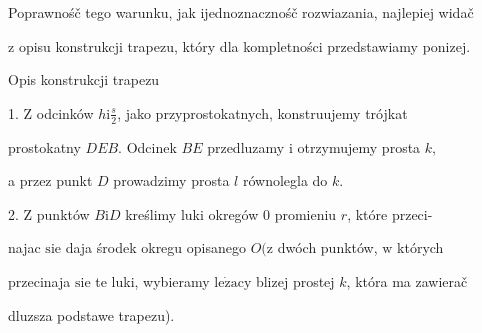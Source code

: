 \documentclass[a4paper,12pt]{article}
\begin{document}
Poprawnośč tego warunku, jak ijednoznacznośč rozwiazania, najlepiej widač

$\mathrm{z}$ opisu konstrukcji trapezu, który dla kompletności przedstawiamy ponizej.

Opis konstrukcji trapezu

1. $\mathrm{Z}$ odcinków $h \mathrm{i} \displaystyle \frac{s}{2}$, jako przyprostokatnych, konstruujemy trójkat

prostokatny $DEB$. Odcinek $BE$ przedluzamy $\mathrm{i}$ otrzymujemy prosta $k,$

a przez punkt $D$ prowadzimy prosta $l$ równolegla do $k.$

2. $\mathrm{Z}$ punktów $B\mathrm{i}D$ kreślimy luki okregów $0$ promieniu $r$, które przeci-

najac $\mathrm{s}\mathrm{i}\mathrm{e}$ daja środek okregu opisanego $O (\mathrm{z}$ dwóch punktów, $\mathrm{w}$ których

przecinaja $\mathrm{s}\mathrm{i}\mathrm{e}$ te luki, wybieramy $\mathrm{l}\mathrm{e}\dot{\mathrm{z}}\mathrm{a}\mathrm{c}\mathrm{y}$ blizej prostej $k$, która ma zawierač

dluzsza podstawe trapezu).
\end{document}
